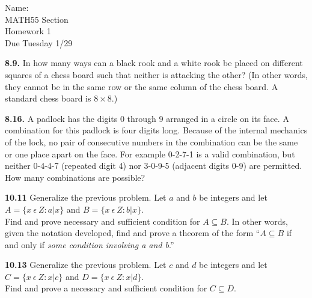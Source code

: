 \documentclass[10pt]{article}
\begin{document}
\begin{flushright}
	Name: \underline{\hspace{3cm}} \\
	MATH55 Section \underline{\hspace{0.5cm}} \\
	Homework 1 \\
	Due Tuesday 1/29
\end{flushright}

\begin{framed}
	\textbf{8.9.} In how many ways can a black rook and a white rook be
	placed on different squares of a chess board such that neither is
	attacking the other? (In other words, they cannot be in the same row or
	the same column of the chess board. A standard chess board is $8 \times
		8$.)
\end{framed}

\pagebreak

\begin{framed}
	\textbf{8.16.} A padlock has the digits 0 through 9 arranged in a
	circle on its
	face. A combination for this padlock is four digits long. Because of
	the
	internal mechanics of the lock, no pair of consecutive numbers in the
	combination can be the same or one place apart on the face. For example
	0-2-7-1
	is a valid combination, but neither 0-4-4-7 (repeated digit 4) nor
	3-0-9-5
	(adjacent digits 0-9) are permitted. \\
	\indent How many combinations are possible?
\end{framed}

\pagebreak

\begin{framed}
	\textbf{10.11} Generalize the previous problem. Let $a$ and $b$ be
	integers and let $ A =
		\{x\:\epsilon\:Z : a | x\} $ and $ B = \{ x\:\epsilon\:Z: b |
		x\} $. \\
	\indent Find and prove necessary and sufficient condition for $ A
		\subseteq B $. In other words, given the notation developed,
	find and prove a theorem of the form ``$A \subseteq B$ if and only if
	\textit{some condition involving a and b}.''

\end{framed}

\pagebreak


\begin{framed}
	\textbf{10.13} Generalize the previous problem. Let $c$ and $d$ be
	integers and let $C = \{x\:\epsilon\:Z : x|c\}$ and $D =
		\{x\:\epsilon\:Z:x|d\}$. \\
	\indent Find and prove a necessary and sufficient condition for
	$ C \subseteq D $.
\end{framed}
\end{document}

